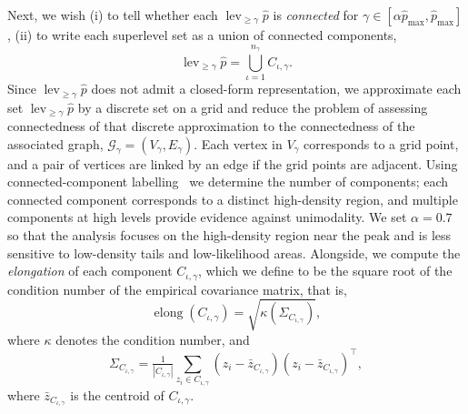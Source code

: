 \documentclass[11pt]{report}
\begin{document}
Next, we wish 
(i) to tell whether each $\operatorname{lev}_{\geq \gamma} \widehat{p}$ is \textit{connected} 
for $\gamma \in [\alpha \widehat{p}_{\max}, \widehat{p}_{\max}]$,
(ii) to write each superlevel set as a union of connected components,
\begin{equation}
    \operatorname{lev}_{\geq \gamma} \widehat{p} = \bigcup_{\iota = 1}^{n_{\gamma}} C_{\iota, \gamma}.
\end{equation}
Since $\operatorname{lev}_{\geq \gamma} \widehat{p}$ does not admit a closed-form representation,
we approximate each set $\operatorname{lev}_{\geq \gamma} \widehat{p}$ by a discrete set on a grid
and reduce the problem of assessing connectedness of that discrete approximation 
to the connectedness of the associated graph, $\mathcal{G}_\gamma = (V_\gamma, E_\gamma)$.
Each vertex in $V_\gamma$ corresponds to a grid point, and a pair of 
vertices are linked by an edge if the grid points are adjacent.
Using connected-component labelling~\cite{HeXiwei2017} we determine the number of components; 
each connected component corresponds to a distinct high-density region, 
and multiple components at high levels provide evidence against unimodality.
We set $\alpha = 0.7$ so that the analysis focuses on the high-density region 
near the peak and is less sensitive to low-density tails and low-likelihood areas.
Alongside, we compute the \textit{elongation} of each component $C_{\iota, \gamma}$, 
which we define to be the square root of the condition number of the empirical 
covariance matrix, that is,
\begin{equation}
    \operatorname{elong}(C_{\iota, \gamma}) = \sqrt{\kappa(\Sigma_{C_{\iota, \gamma}})},
\end{equation}
where $\kappa$ denotes the condition number, and 
\begin{equation}
    \Sigma_{C_{\iota, \gamma}}
    {}={}
    \tfrac{1}{|C_{\iota, \gamma}|}
    \sum_{z_i \in C_{\iota, \gamma}} 
        (z_i - \bar{z}_{C_{\iota, \gamma}})
        (z_i - \bar{z}_{C_{\iota, \gamma}})^\intercal,
\end{equation}
where $\bar{z}_{C_{\iota, \gamma}}$ is the centroid of $C_{\iota, \gamma}$.
\end{document}
